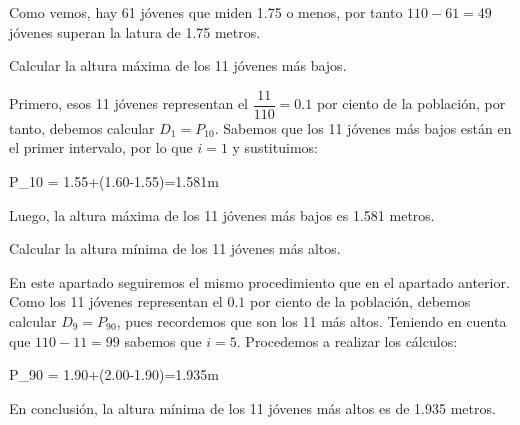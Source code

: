 Como vemos, hay 61 jóvenes que miden 1.75 o menos, por tanto $110-61=49$ jóvenes superan la latura de 1.75 metros.

\subproblem
Calcular la altura máxima de los 11 jóvenes más bajos.

Primero, esos 11 jóvenes representan el $\dfrac{11}{110}=0.1$ por ciento de la población, por tanto, debemos calcular $D_{1} = P_{10}$. Sabemos que los 11 jóvenes más bajos están en el primer intervalo, por lo que $i=1$ y sustituimos:

\begin{center}
    \begin{*gather}
        P_{10} = 1.55+(1.60-1.55)=1.581m
    \end{*gather}
\end{center}

Luego, la altura máxima de los 11 jóvenes más bajos es 1.581 metros.

\subproblem 
Calcular la altura mínima de los 11 jóvenes más altos.

En este apartado seguiremos el mismo procedimiento que en el apartado anterior. Como los 11 jóvenes representan el $0.1$ por ciento de la población, debemos calcular $D_{9} = P_{90}$, pues recordemos que son los 11 más altos. Teniendo en cuenta que $110-11=99$ sabemos que $i=5$. Procedemos a realizar los cálculos:

\begin{center}
    \begin{*gather}
        P_{90} = 1.90+(2.00-1.90)=1.935m
    \end{*gather}
\end{center}

En conclusión, la altura mínima de los 11 jóvenes más altos es de 1.935 metros. 
